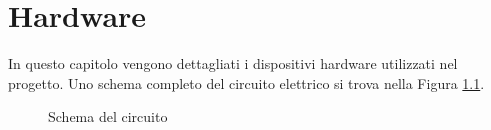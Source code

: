 \documentclass[12pt]{report}
\begin{document}
\chapter{Hardware}
\label{cap2}
%

In questo capitolo vengono dettagliati i dispositivi hardware utilizzati nel progetto. Uno schema completo del circuito elettrico si trova nella Figura \ref{fig:schematics}.

\begin{figure}
	\caption{Schema del circuito}
	\label{fig:schematics}
\end{figure}
\end{document}
